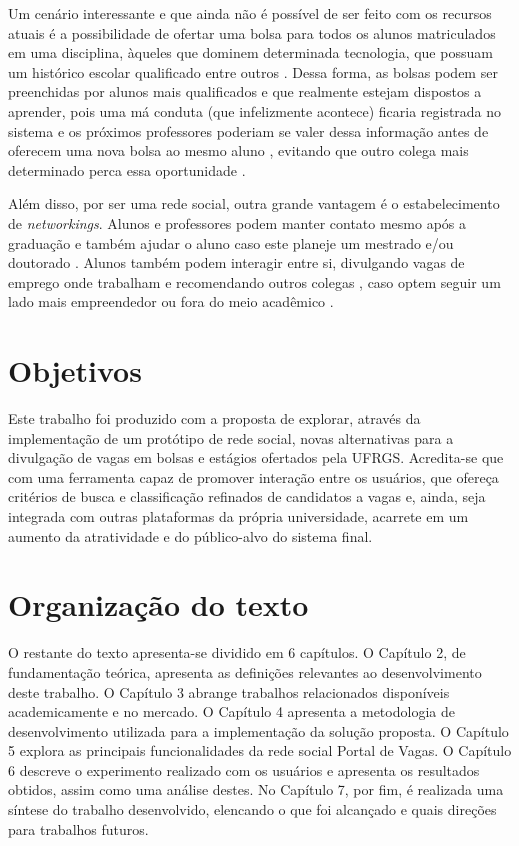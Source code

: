 Um cenário interessante e que ainda não é possível de ser feito com os recursos atuais é a possibilidade de ofertar uma bolsa para todos os alunos matriculados em uma disciplina, àqueles que dominem determinada tecnologia, que possuam um histórico escolar qualificado entre outros \cite{designCurriculumArticle} \cite{minigLinkedinInbook}. Dessa forma, as bolsas podem ser preenchidas por alunos mais
qualificados e que realmente estejam dispostos a aprender, pois uma má conduta (que infelizmente acontece) ficaria registrada no sistema e os próximos professores poderiam se valer dessa informação antes de oferecem uma nova bolsa ao mesmo aluno \cite{academicAchievmentArticle}, evitando que
outro colega mais determinado perca essa oportunidade \cite{futureITLinkedinArticle}. 

Além disso, por ser uma rede social, outra grande vantagem é o estabelecimento de \textit{networkings}. Alunos e professores podem manter contato mesmo após a graduação e também ajudar o aluno caso este planeje um mestrado e/ou doutorado \cite{alumniInbook}. Alunos também podem interagir entre si, divulgando vagas de emprego onde trabalham e recomendando outros colegas \cite{recommendPeopleInbook}, caso optem seguir um lado mais empreendedor \cite{SNsEntrepreunersInbook} ou fora do meio acadêmico \cite{globalParticipationInbook}.


\section{Objetivos}
\label{introducaoObjetivos}
Este trabalho foi produzido com a proposta de explorar, através da implementação de um protótipo de rede social, novas alternativas para a divulgação de vagas em bolsas e estágios ofertados pela UFRGS. Acredita-se que com uma ferramenta capaz de promover interação entre os usuários, que ofereça critérios de busca e classificação refinados de candidatos a vagas e, ainda, seja integrada com outras plataformas da própria universidade, acarrete em um aumento da atratividade e do público-alvo do sistema final.


\section{Organização do texto}
\label{introducaoOrganizacao}
O restante do texto apresenta-se dividido em 6 capítulos. O Capítulo 2, de fundamentação teórica, apresenta as definições relevantes ao desenvolvimento deste trabalho. O Capítulo 3 abrange trabalhos relacionados disponíveis academicamente e no mercado. O Capítulo 4 apresenta a metodologia de desenvolvimento utilizada para a implementação da solução proposta. O Capítulo 5 explora as principais funcionalidades da rede social Portal de Vagas. O Capítulo 6 descreve o experimento realizado com os usuários e apresenta os resultados obtidos, assim como uma análise destes. No Capítulo 7, por fim, é realizada uma síntese do trabalho desenvolvido, elencando o que foi alcançado e quais direções para trabalhos futuros.